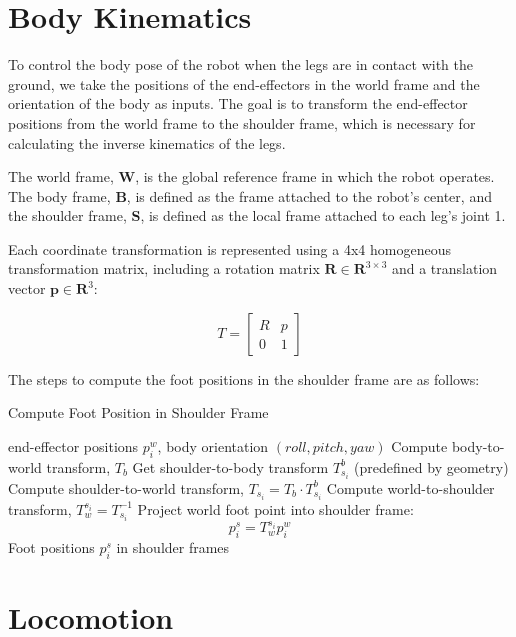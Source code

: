 \documentclass[a4paper,11pt]{article}
\begin{document}
\section{Body Kinematics}

To control the body pose of the robot when the legs are in contact with the ground, we take
the positions of the end-effectors in the world frame and the orientation of the body as inputs.
The goal is to transform the end-effector positions from the world frame to the shoulder frame, which is necessary for
calculating the inverse kinematics of the legs.

The world frame, $\boldsymbol{W}$, is the global reference frame in which the robot operates. 
The body frame, $\boldsymbol{B}$, is defined as the frame attached to the robot's center, and 
the shoulder frame, $\boldsymbol{S}$, is defined as the local frame attached to each leg's joint 1.

Each coordinate transformation is represented using a 4x4 homogeneous transformation matrix, including a rotation matrix $\mathbf{R} \in \mathbf{R}^{3 \times 3}$
and a translation vector $\mathbf{p} \in \mathbf{R}^{3}$:

$$
T = \begin{bmatrix}
R & p \\
0 & 1
\end{bmatrix}
$$

The steps to compute the foot positions in the shoulder frame are as follows:

\begin{algorithm}[H]
\caption{Compute Foot Position in Shoulder Frame}
\begin{algorithmic}[1]
\Require end-effector positions $p^w_i$, body orientation $(roll, pitch, yaw)$
\State Compute body-to-world transform, $T_b$
    \State Get shoulder-to-body transform $T_{s_i}^b$ (predefined by geometry)
    \State Compute shoulder-to-world transform, $T_{s_i} = T_b \cdot T_{s_i}^b$
    \State Compute world-to-shoulder transform, $T_w^{s_i} = T_{s_i}^{-1}$
    \State Project world foot point into shoulder frame:
    $$
    p_i^s = T_w^{s_i} p_i^w
    $$
\EndFor
\State \Return Foot positions $p_i^s$ in shoulder frames
\end{algorithmic}
\end{algorithm}

\section{Locomotion}
\end{document}
